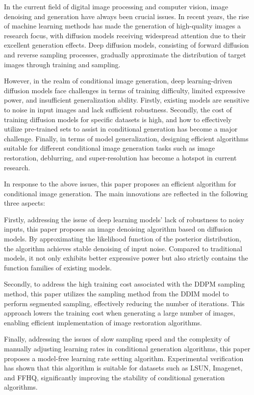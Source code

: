 \begin{abstract*}
In the current field of digital image processing and computer vision, image denoising and generation have always been crucial issues. In recent years, the rise of machine learning methods has made the generation of high-quality images a research focus, with diffusion models receiving widespread attention due to their excellent generation effects. Deep diffusion models, consisting of forward diffusion and reverse sampling processes, gradually approximate the distribution of target images through training and sampling.

However, in the realm of conditional image generation, deep learning-driven diffusion models face challenges in terms of training difficulty, limited expressive power, and insufficient generalization ability. Firstly, existing models are sensitive to noise in input images and lack sufficient robustness. Secondly, the cost of training diffusion models for specific datasets is high, and how to effectively utilize pre-trained sets to assist in conditional generation has become a major challenge. Finally, in terms of model generalization, designing efficient algorithms suitable for different conditional image generation tasks such as image restoration, deblurring, and super-resolution has become a hotspot in current research.

In response to the above issues, this paper proposes an efficient algorithm for conditional image generation. The main innovations are reflected in the following three aspects:

Firstly, addressing the issue of deep learning models' lack of robustness to noisy inputs, this paper proposes an image denoising algorithm based on diffusion models. By approximating the likelihood function of the posterior distribution, the algorithm achieves stable denoising of input noise. Compared to traditional models, it not only exhibits better expressive power but also strictly contains the function families of existing models.

Secondly, to address the high training cost associated with the DDPM sampling method, this paper utilizes the sampling method from the DDIM model to perform segmented sampling, effectively reducing the number of iterations. This approach lowers the training cost when generating a large number of images, enabling efficient implementation of image restoration algorithms.

Finally, addressing the issues of slow sampling speed and the complexity of manually adjusting learning rates in conditional generation algorithms, this paper proposes a model-free learning rate setting algorithm. Experimental verification has shown that this algorithm is suitable for datasets such as LSUN, Imagenet, and FFHQ, significantly improving the stability of conditional generation algorithms.


\end{abstract*}
